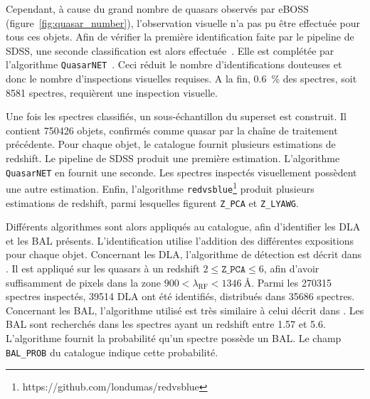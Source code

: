 Cependant, à cause du grand nombre de quasars observés par eBOSS (figure~\ref{fig:quasar_number}), l'observation visuelle n'a pas pu être effectuée pour tous ces objets.
Afin de vérifier la première identification faite par le pipeline de SDSS, une seconde classification est alors effectuée~\autocite{Lyke2020}. Elle est complétée par l'algorithme \texttt{QuasarNET}~\autocite{Busca2018}. Ceci réduit le nombre d'identifications douteuses et donc le nombre d'inspections visuelles requises. A la fin, \SI{0.6}{\percent} des spectres, soit \num{8581} spectres, requièrent une inspection visuelle.

Une fois les spectres classifiés, un sous-échantillon du superset est construit. Il contient \num{750426} objets, confirmés comme quasar par la chaîne de traitement précédente.
Pour chaque objet, le catalogue fournit plusieurs estimations de redshift. Le pipeline de SDSS produit une première estimation. L'algorithme \texttt{QuasarNET} en fournit une seconde. Les spectres inspectés visuellement possèdent une autre estimation. Enfin, l'algorithme \texttt{redvsblue}\footnote{https://github.com/londumas/redvsblue} produit plusieurs estimations de redshift, parmi lesquelles figurent \texttt{Z\_PCA} et \texttt{Z\_LYAWG}.

Différents algorithmes sont alors appliqués au catalogue, afin d'identifier les DLA et les BAL présents. L'identification utilise l'addition des différentes expositions pour chaque objet.
Concernant les DLA, l'algorithme de détection est décrit dans \textcite{Parks2017}. Il est appliqué sur les quasars à un redshift $2 \leq \texttt{Z\_PCA} \leq 6$, afin d'avoir suffisamment de pixels dans la zone $900 < \lambda_{\mathrm{RF}} < \SI{1346}{\angstrom}$. Parmi les \num{270315} spectres inspectés, \num{39514} DLA ont été identifiés, distribués dans \num{35686} spectres.
Concernant les BAL, l'algorithme utilisé est très similaire à celui décrit dans \textcite{Guo2019}. Les BAL sont recherchés dans les spectres ayant un redshift entre \num{1.57} et \num{5.6}. L'algorithme fournit la probabilité qu'un spectre possède un BAL. Le champ \texttt{BAL\_PROB} du catalogue indique cette probabilité.

